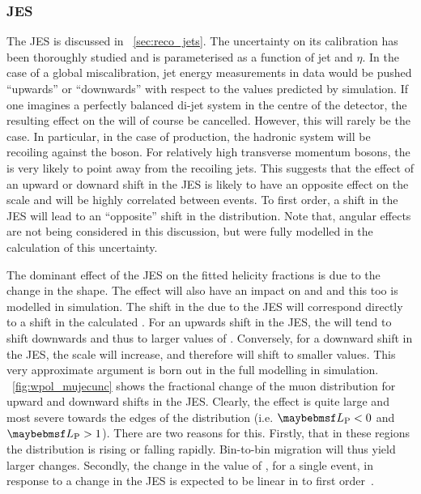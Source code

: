 \subsubsection{\acl{JES}}
\label{sec:wpol_syst_jec}
The \ac{JES} is discussed in \sec~\ref{sec:reco_jets}. The uncertainty on its
calibration has been thoroughly studied and is parameterised as a function of
jet \Pt and $\eta$. In the case of a global miscalibration, jet energy
measurements in data would be pushed ``upwards'' or ``downwards'' with respect
to the values predicted by simulation. If one imagines a perfectly balanced
di-jet system in the centre of the detector, the resulting effect on the \METv
will of course be cancelled. However, this will rarely be the case. In
particular, in the case of \Wjets production, the hadronic system will be
recoiling against the \PW boson. For relatively high transverse momentum \PW
bosons, the \METv is very likely to point away from the recoiling jets. This
suggests that the effect of an upward or downard shift in the \ac{JES} is likely
to have an opposite effect on the \METv scale and will be highly correlated
between events. To first order, a shift in the \ac{JES} will lead to an
``opposite'' shift in the \MET distribution. Note that, angular effects are not
being considered in this discussion, but were fully modelled in the calculation
of this uncertainty.

The dominant effect of the \ac{JES} on the fitted helicity fractions is due to
the change in the \LP shape. The effect will also have an impact on \PtW and \MT
and this too is modelled in simulation. The shift in the \MET due to the
\ac{JES} will correspond directly to a shift in the calculated \LP. For an
upwards shift in the \ac{JES}, the \MET will tend to shift downwards and thus to
larger values of \LP. Conversely, for a downward shift in the \ac{JES}, the \MET
scale will increase, and therefore \LP will shift to smaller values. This very
approximate argument is born out in the full modelling in
simulation. \fig~\ref{fig:wpol_mujecunc} shows the fractional change of the muon
\LP distribution for upward and downward shifts in the \ac{JES}. Clearly, the
effect is quite large and most severe towards the edges of the \LP distribution
(i.e. $\LP < 0$ and $\LP > 1$). There are two reasons for this. Firstly, that in
these regions the \LP distribution is rising or falling rapidly. Bin-to-bin
migration will thus yield larger changes. Secondly, the change in the value of
\LP, for a single event, in response to a change in the \ac{JES} is expected to
be linear in \LP to first order~\cite{susy_ra4_pas}.

